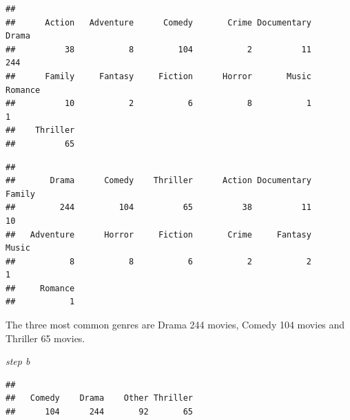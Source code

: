 \documentclass[
]{article}
\newenvironment{Shaded}{\begin{snugshade}}{\end{snugshade}}
\newcommand{\AttributeTok}[1]{\textcolor[rgb]{0.13,0.29,0.53}{#1}}
\newcommand{\CommentTok}[1]{\textcolor[rgb]{0.56,0.35,0.01}{\textit{#1}}}
\newcommand{\ConstantTok}[1]{\textcolor[rgb]{0.56,0.35,0.01}{#1}}
\newcommand{\FunctionTok}[1]{\textcolor[rgb]{0.13,0.29,0.53}{\textbf{#1}}}
\newcommand{\NormalTok}[1]{#1}
\newcommand{\OtherTok}[1]{\textcolor[rgb]{0.56,0.35,0.01}{#1}}
\newcommand{\SpecialCharTok}[1]{\textcolor[rgb]{0.81,0.36,0.00}{\textbf{#1}}}
\newcommand{\StringTok}[1]{\textcolor[rgb]{0.31,0.60,0.02}{#1}}
\begin{document}
\begin{verbatim}
## 
##      Action   Adventure      Comedy       Crime Documentary       Drama 
##          38           8         104           2          11         244 
##      Family     Fantasy     Fiction      Horror       Music     Romance 
##          10           2           6           8           1           1 
##    Thriller 
##          65
\end{verbatim}

\begin{Shaded}
\end{Shaded}

\begin{verbatim}
## 
##       Drama      Comedy    Thriller      Action Documentary      Family 
##         244         104          65          38          11          10 
##   Adventure      Horror     Fiction       Crime     Fantasy       Music 
##           8           8           6           2           2           1 
##     Romance 
##           1
\end{verbatim}

The three most common genres are Drama 244 movies, Comedy 104 movies and
Thriller 65 movies.

\emph{step b}

\begin{Shaded}
\end{Shaded}

\begin{verbatim}
## 
##   Comedy    Drama    Other Thriller 
##      104      244       92       65
\end{verbatim}
\end{document}
